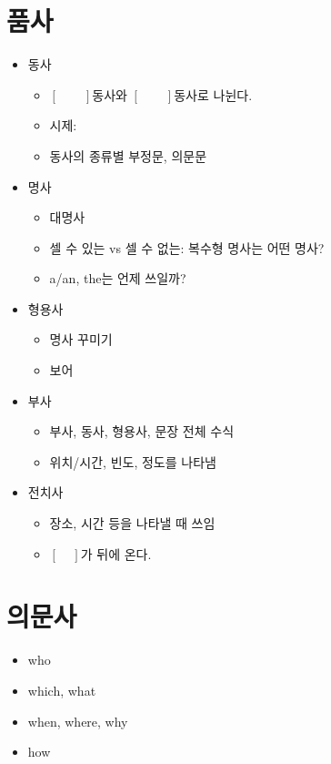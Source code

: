 \documentclass[11pt, twocolumn, a4paper]{oblivoir}
\begin{document}
    \section*{품사}
    \begin{itemize}
        \item 동사
        \begin{itemize}
            \item $[\qquad]$동사와 $[\qquad]$동사로 나뉜다. 
            \item 시제: 
            \item 동사의 종류별 부정문, 의문문
        \end{itemize}
        \item 명사
        \begin{itemize}
            \item 대명사
            \item 셀 수 있는 vs 셀 수 없는: 복수형 명사는 어떤 명사? 
            \item a/an, the는 언제 쓰일까? 
        \end{itemize}
        \item 형용사
        \begin{itemize}
            \item 명사 꾸미기
            \item 보어
        \end{itemize}
        \item 부사
        \begin{itemize}
            \item 부사, 동사, 형용사, 문장 전체 수식
            \item 위치/시간, 빈도, 정도를 나타냄 
        \end{itemize}
        \item 전치사
        \begin{itemize}
            \item 장소, 시간 등을 나타낼 때 쓰임 
            \item $[\ \ \ \ \ ]$가 뒤에 온다. 
        \end{itemize}
    \end{itemize}

    \section*{의문사}
    \begin{itemize}
        \item who
        \item which, what
        \item when, where, why
        \item how
    \end{itemize}
\end{document}
